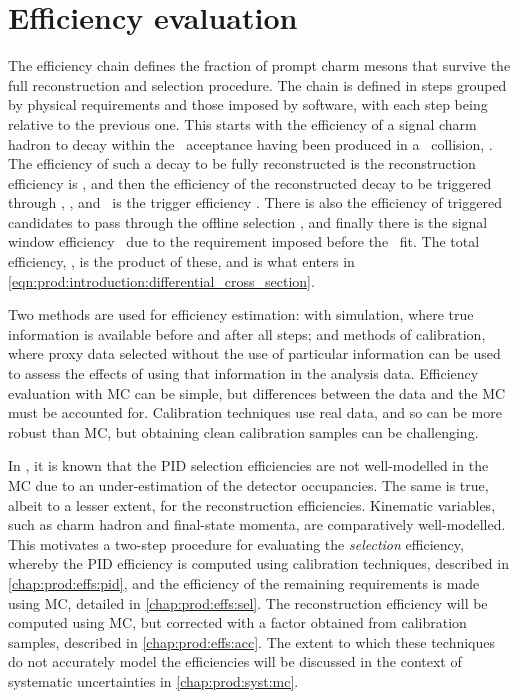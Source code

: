 \chapter{Efficiency evaluation}
\label{chap:prod:effs}

The efficiency chain defines the fraction of prompt charm mesons that survive
the full reconstruction and selection procedure.
The chain is defined in steps grouped by physical requirements and those
imposed by software, with each step being relative to the previous one.
This starts with the efficiency of a signal charm hadron to decay within the
\lhcb\ acceptance having been produced in a \pp\ collision, \effacc.
The efficiency of such a decay to be fully reconstructed is the reconstruction
efficiency is \effreco, and then the efficiency of the reconstructed decay to
be triggered through \lzero, \hltone, and \hlttwo\ is the trigger efficiency
\efftrig.
There is also the efficiency of triggered candidates to pass through the
offline selection \effoffline, and finally there is the signal window
efficiency \effsigwin\ due to the requirement imposed before the \lnipchisq\
fit.
The total efficiency, \eff, is the product of these, and is what enters in
\cref{eqn:prod:introduction:differential_cross_section}.

Two methods are used for efficiency estimation: with simulation, where
true information is available before and after all steps; and methods of
calibration, where proxy data selected without the use of particular
information can be used to assess the effects of using that information in the
analysis data.
Efficiency evaluation with \ac{MC} can be simple, but differences between the
data and the \ac{MC} must be accounted for.
Calibration techniques use real data, and so can be more robust than \ac{MC},
but obtaining clean calibration samples can be challenging.

In \lhcb, it is known that the \ac{PID} selection efficiencies are not
well-modelled in the \ac{MC} due to an under-estimation of the detector
occupancies.
The same is true, albeit to a lesser extent, for the reconstruction
efficiencies.
Kinematic variables, such as charm hadron and final-state momenta, are
comparatively well-modelled.
This motivates a two-step procedure for evaluating the \emph{selection}
efficiency, whereby the \ac{PID} efficiency is computed using calibration
techniques, described in \cref{chap:prod:effs:pid}, and the efficiency of the remaining
requirements is made using \ac{MC}, detailed in \cref{chap:prod:effs:sel}.
The reconstruction efficiency will be computed using \ac{MC}, but corrected
with a factor obtained from calibration samples, described in \cref{chap:prod:effs:acc}.
The extent to which these techniques do not accurately model the efficiencies
will be discussed in the context of systematic uncertainties in
\cref{chap:prod:syst:mc}.

